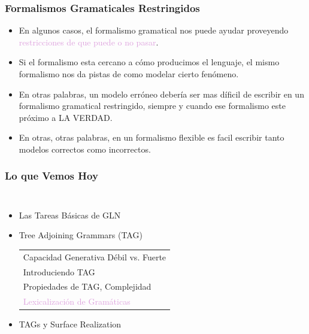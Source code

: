 \documentclass[compress,color=usenames]{beamer}
\newcommand{\mH}[1]{\textcolor{Plum}{#1}}
\begin{document}
\begin{frame}
\frametitle{Formalismos Gramaticales Restringidos}

\begin{itemize}

\item En algunos casos, el formalismo gramatical nos puede ayudar proveyendo 
\mH{restricciones de que puede o no pasar}. 

\item Si el formalismo esta cercano a c\'omo producimos el lenguaje, el mismo 
formalismo nos da pistas de como modelar cierto fen\'omeno.

\item En otras palabras, un modelo err\'oneo deber\'ia ser mas d\'ificil de
escribir en un formalismo gramatical restringido, siempre y cuando ese formalismo 
este pr\'oximo a LA VERDAD. 

\item En otras, otras palabras, en un formalismo flexible es facil escribir 
tanto modelos correctos como incorrectos. 

\end{itemize}
\end{frame}

\begin{frame}
\frametitle{Lo que Vemos Hoy}

\begin{columns}
\begin{itemize}
\item Las Tareas B\'asicas de GLN
\item Tree Adjoining Grammars (TAG)
\begin{tabular}{|l}
Capacidad Generativa D\'ebil vs. Fuerte\\
Introduciendo TAG\\
Propiedades de TAG, Complejidad\\
\mH{Lexicalizaci\'on de Gram\'aticas}
\end{tabular}

\item TAGs y Surface Realization
\end{itemize}
\end{columns}
\end{frame}
\end{document}
